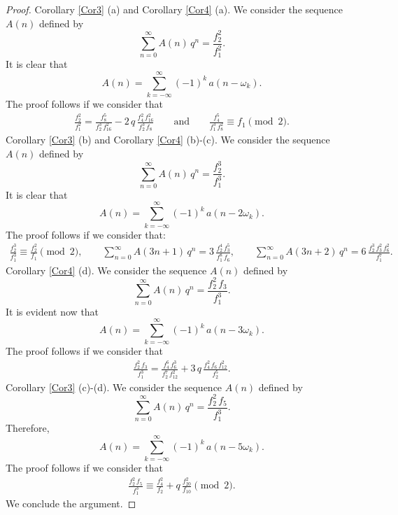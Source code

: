 \documentclass[10pt,a4paper]{amsart}
\begin{document}
\begin{proof}

	Corollary \ref{Cor3} (a) and Corollary \ref{Cor4} (a). We consider the sequence $A(n)$ defined by
	$$
	\sum_{n=0}^\infty A(n)\,q^n = \frac{f_2^2}{f_1^2}.
	$$
		It is clear that
	$$
	A(n)=\sum_{k=-\infty}^\infty (-1)^k\,a\left(n-\omega_k\right).
	$$
	The proof follows if we consider that
	\begin{align*}
	\frac{f_2^2}{f_1^2} = \frac{f_8^5}{f_2^3\,f_{16}^2}-2\,q\, \frac{f_4^2\,f_{16}^2}{f_2^3\,f_8} \qquad \text{and} \qquad
	\frac{f_4^5}{f_1^3\,f_{8}^2} \equiv f_1 \pmod 2.
	\end{align*}
	Corollary \ref{Cor3} (b) and Corollary \ref{Cor4} (b)-(c).  We consider the sequence $A(n)$ defined by
	$$
	\sum_{n=0}^\infty A(n)\,q^n = \frac{f_2^3}{f_1^3}.
	$$
	It is clear that
	$$
	A(n)=\sum_{k=-\infty}^\infty (-1)^k\,a\left(n-2\omega_k\right).
	$$
	The proof follows if we consider that:
	\begin{align*}
	 \frac{f_2^3}{f_1^3} \equiv \frac{f_2^2}{f_1} \pmod 2, \qquad
	 \sum_{n=0}^\infty A(3n+1)\,q^n =3\, \frac{f_2^4\,f_3^5}{f_1^8\,f_6}, \qquad
	 \sum_{n=0}^\infty A(3n+2)\,q^n =6\, \frac{f_2^3\,f_3^2\,f_6^2}{f_1^7}.
	\end{align*}
	Corollary \ref{Cor4} (d).  We consider the sequence $A(n)$ defined by
	$$
	\sum_{n=0}^\infty A(n)\,q^n = \frac{f_2^2\,f_3}{f_1^3}.
	$$
	It is evident now that
	$$
	A(n)=\sum_{k=-\infty}^\infty (-1)^k\,a\left(n-3\omega_k\right).
	$$
	The proof follows if we consider that
	\begin{align*}
	\frac{f_2^2\,f_3}{f_1^3} = \frac{f_4^6\,f_6^3}{f_2^7\,f_{12}^2} + 3\,q\,\frac{f_4^2\,f_6\,f_{12}^2}{f_2^5}.
	\end{align*}
	Corollary \ref{Cor3} (c)-(d). We consider the sequence $A(n)$ defined by
	$$
	\sum_{n=0}^\infty A(n)\,q^n = \frac{f_2^2\,f_5}{f_1^3}.
	$$
	Therefore, 
	$$
	A(n)=\sum_{k=-\infty}^\infty (-1)^k\,a\left(n-5\omega_k\right).
	$$
	The proof follows if we consider that
	\begin{align*}
	\frac{f_2^2\,f_5}{f_1^3} \equiv \frac{f_4^2}{f_2} + q\,\frac{f_{20}^2}{f_{10}} \pmod 2.
	\end{align*}
We conclude the argument.
\end{proof}
\end{document}
